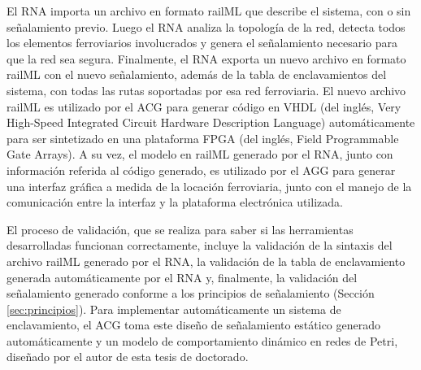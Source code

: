     El RNA importa un archivo en formato railML que describe el sistema, con o sin señalamiento previo. Luego el RNA analiza la topología de la red, detecta todos los elementos ferroviarios involucrados y genera el señalamiento necesario para que la red sea segura. Finalmente, el RNA exporta un nuevo archivo en formato railML con el nuevo señalamiento, además de la tabla de enclavamientos del sistema, con todas las rutas soportadas por esa red ferroviaria. El nuevo archivo railML es utilizado por el ACG para generar código en VHDL \cite{Paper_206} (del inglés, Very High-Speed Integrated Circuit Hardware Description Language) automáticamente para ser sintetizado en una plataforma FPGA \cite{Paper_8,Paper_25,Paper_34,Paper_46,Paper_49} (del inglés, Field Programmable Gate Arrays). A su vez, el modelo en railML generado por el RNA, junto con información referida al código generado, es utilizado por el AGG para generar una interfaz gráfica a medida de la locación ferroviaria, junto con el manejo de la comunicación entre la interfaz y la plataforma electrónica utilizada.
    
    El proceso de validación, que se realiza para saber si las herramientas desarrolladas funcionan correctamente, incluye la validación de la sintaxis del archivo railML generado por el RNA, la validación de la tabla de enclavamiento generada automáticamente por el RNA y, finalmente, la validación del señalamiento generado conforme a los principios de señalamiento (Sección \ref{sec:principios}). Para implementar automáticamente un sistema de enclavamiento, el ACG toma este diseño de señalamiento estático generado automáticamente y un modelo de comportamiento dinámico en redes de Petri, diseñado por el autor de esta tesis de doctorado. 



%
